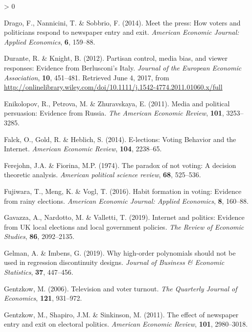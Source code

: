 \documentclass[
  12pt,
]{article}
\newlength{\cslhangindent}
\newenvironment{CSLReferences}[2] %
 {%
  \setlength{\parindent}{0pt}
  \ifodd #1 \everypar{\setlength{\hangindent}{\cslhangindent}}\ignorespaces\fi
  \ifnum #2 > 0
  \setlength{\parskip}{#2\baselineskip}
  \fi
 }%
 {}
\begin{document}
\begin{CSLReferences}{1}{0}
\leavevmode\hypertarget{ref-drago_meet_2014}{}%
Drago, F., Nannicini, T. \& Sobbrio, F. (2014). Meet the press: {How}
voters and politicians respond to newspaper entry and exit.
\emph{American Economic Journal: Applied Economics}, \textbf{6},
159--88.

\leavevmode\hypertarget{ref-durante_partisan_2012}{}%
Durante, R. \& Knight, B. (2012). Partisan control, media bias, and
viewer responses: {Evidence} from {Berlusconi}'s {Italy}. \emph{Journal
of the European Economic Association}, \textbf{10}, 451--481. Retrieved
June 4, 2017, from
\url{http://onlinelibrary.wiley.com/doi/10.1111/j.1542-4774.2011.01060.x/full}

\leavevmode\hypertarget{ref-enikolopov_media_2011}{}%
Enikolopov, R., Petrova, M. \& Zhuravskaya, E. (2011). Media and
political persuasion: {Evidence} from {Russia}. \emph{The American
Economic Review}, \textbf{101}, 3253--3285.

\leavevmode\hypertarget{ref-falck_e-lections:_2014}{}%
Falck, O., Gold, R. \& Heblich, S. (2014). E-lections: {Voting}
{Behavior} and the {Internet}. \emph{American Economic Review},
\textbf{104}, 2238--65.

\leavevmode\hypertarget{ref-ferejohn_paradox_1974}{}%
Ferejohn, J.A. \& Fiorina, M.P. (1974). The paradox of not voting: {A}
decision theoretic analysis. \emph{American political science review},
\textbf{68}, 525--536.

\leavevmode\hypertarget{ref-fujiwara_habit_2016}{}%
Fujiwara, T., Meng, K. \& Vogl, T. (2016). Habit formation in voting:
{Evidence} from rainy elections. \emph{American Economic Journal:
Applied Economics}, \textbf{8}, 160--88.

\leavevmode\hypertarget{ref-gavazza_internet_2019}{}%
Gavazza, A., Nardotto, M. \& Valletti, T. (2019). Internet and politics:
{Evidence} from {UK} local elections and local government policies.
\emph{The Review of Economic Studies}, \textbf{86}, 2092--2135.

\leavevmode\hypertarget{ref-gelman_why_2019}{}%
Gelman, A. \& Imbens, G. (2019). Why high-order polynomials should not
be used in regression discontinuity designs. \emph{Journal of Business
\& Economic Statistics}, \textbf{37}, 447--456.

\leavevmode\hypertarget{ref-gentzkow_television_2006}{}%
Gentzkow, M. (2006). Television and voter turnout. \emph{The Quarterly
Journal of Economics}, \textbf{121}, 931--972.

\leavevmode\hypertarget{ref-gentzkow_effect_2011}{}%
Gentzkow, M., Shapiro, J.M. \& Sinkinson, M. (2011). The effect of
newspaper entry and exit on electoral politics. \emph{American Economic
Review}, \textbf{101}, 2980--3018.


\end{CSLReferences}
\end{document}
